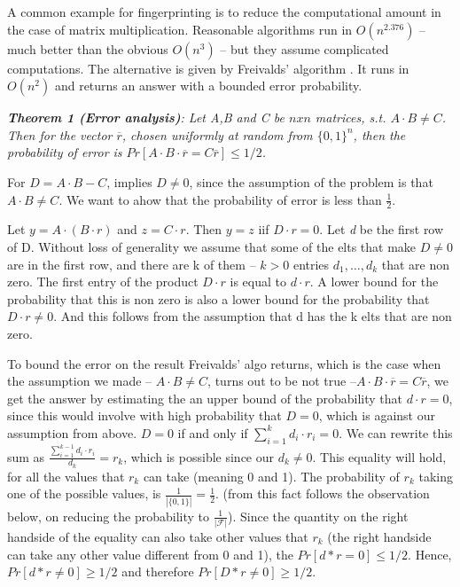 \documentclass[11pt]{article}
\begin{document}
A common example for fingerprinting is to reduce the computational amount in the case of matrix multiplication. Reasonable algorithms run in $O(n^{2.376})$ --much better than the obvious $O(n^3)$ -- but they assume complicated computations. The alternative is given by Freivalds' algorithm . It runs in $O(n^2)$ and returns an answer with a bounded error probability. 

\medskip
\textit{\textbf{Theorem 1 (Error analysis)}: Let A,B and C be $n x n$ matrices, s.t. $A \cdotp B \neq C$. Then for the vector $\overline{r}$, chosen uniformly at random from ${\{0,1\}}^n$, then the probability of error is $Pr[A \cdotp B \cdotp \overline{r}=C\overline{r}] \leq 1/2$.}
\medskip

For $D = A \cdotp B - C$, implies $D \neq 0$, since the assumption of the problem is that $A \cdotp B \neq C$. We want to ahow that the probability of error is less than $\frac{1}{2}$.

Let $y = A \cdotp (B \cdotp r)$ and $z = C \cdotp r$. Then $y = z$ iif $D \cdotp r = 0$. Let \textit{d} be the first row of D. Without loss of generality we assume that some of the elts that make $D \neq 0$ are in the first row, and there are k of them -- $k > 0$ entries $d_1, \dots ,d_k$ that are non zero. The first entry of the product $D\cdotp r$ is equal to $d \cdotp r$. A lower bound for the probability that this is non zero is also a lower bound for the probability that $D \cdotp r \neq 0$. And this follows from the assumption that d has the k elts that are non zero. 

To bound the error on the result Freivalds' algo returns, which is the case when the assumption we made -- $A \cdotp B \neq C$, turns out to be not true --$A \cdotp B \cdotp \overline{r}=C\overline{r}$, we get the answer by estimating the an upper bound of the probability that $d \cdotp r = 0$, since this would involve with high probability that $D = 0$, which is against our assumption from above. $D = 0$ if and only if $\sum_{i=1}^{k}d_i \cdotp r_i = 0$. We can rewrite this sum as $\frac{\sum_{i=1}^{k-1}d_i \cdotp r_i}{d_k} = r_k$, which is possible since our $d_k \neq 0$. This equality will hold, for all the values that $r_k$ can take (meaning 0 and 1). The probability of $r_k$ taking one of the possible values, is $\frac{1}{|\{0,1\}|} = \frac{1}{2}$. (from this fact follows the observation below, on reducing the probability to $\frac{1}{|\mathcal{F}|}$). Since the quantity on the right handside of the equality can also take other values that $r_k$ (the right handside can take any other value different from 0 and 1), the $Pr[d * r = 0] \leq 1/2$. Hence, $Pr[d * r \neq 0] \geq 1/2$ and therefore $Pr[D * r \neq 0] \geq 1/2$.
\end{document}

